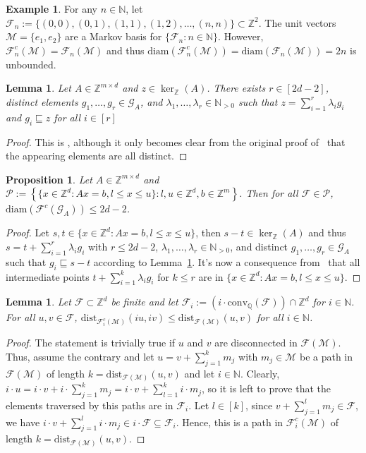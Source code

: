 \documentclass[11pt]{amsart}
\newtheorem{lemma}[thm]{Lemma}
\newtheorem{prop}[thm]{Proposition}
\theoremstyle{definition}
\newtheorem{example}[thm]{Example}
\numberwithin{equation}{section}
\newcommand{\ring}[1]{\ensuremath{\mathbb{#1}}}
\renewcommand{\>}{\rangle}
\newcommand{\<}{\langle}
\newcommand{\0}{\mathbf{0}}
\newcommand{\1}{\mathbf{1}}
\newcommand{\2}{\mathbf{2}}
\newcommand\NN{\ring{N}}
\newcommand\QQ{\ring{Q}}
\newcommand\ZZ{\ring{Z}}
\newcommand\cF{{\mathcal F}}
\newcommand\cM{{\mathcal M}}
\newcommand\cG{{\mathcal G}}
\newcommand\cP{{\mathcal P}}
\newcommand{\graver}[1]{\mathcal{G}_{#1}}
\newcommand{\diam}[1]{\mathrm{diam}(#1)}
\newcommand{\dist}[3]{\mathrm{dist}_{#1}(#2,#3)}
\newcommand{\conv}[1]{\mathrm{conv}_\QQ(#1)}
\begin{document}
\begin{example}\label{ex:StairCase}
For any $n\in\NN$, let
$\cF_n:=\{(0,0),(0,1),(1,1),(1,2),\dots,(n,n)\}\subset\ZZ^2$. The
unit vectors $\cM=\{e_1,e_2\}$ are a Markov basis for
$\{\cF_n:n\in\NN\}$. However,
$\cF_n^c(\cM)=\cF_n(\cM)$ and thus $\diam{\cF^c_n(\cM)}=\diam{\cF_n(\cM)}=2n$
is unbounded.
\end{example}

\begin{lemma}\label{l:SignCompatibility}
Let $A\in\ZZ^{m\times d}$ and $z\in\ker_\ZZ(A)$. There exists
$r\in[2d-2]$, distinct elements $g_1,\dots,g_r\in\cG_A$, and
$\lambda_1,\dots,\lambda_r\in\NN_{>0}$ such that
$z=\sum_{i=1}^r\lambda_ig_i$ and $g_i\sqsubseteq z$ for all $i\in[r]$
\end{lemma}
\begin{proof}
This is \cite[Lemma~3.2.3]{Loera2013}, although it only becomes clear
from the original proof of~\cite[Theorem~2.1]{Sebo1990} that the
appearing elements are all distinct.
\end{proof}

\begin{prop}\label{p:DiamCompressedGraverFiberGraphs}
Let $A\in\ZZ^{m\times d}$ and
$\cP:=\left\{\{x\in\ZZ^d: Ax=b, l\le x\le u\}:
l,u\in\ZZ^d,b\in\ZZ^m\right\}$.
Then for all $\cF\in\cP$, 
$\diam{\cF^c(\graver{A})}\le 2d-2$.
\end{prop}
\begin{proof} Let $s,t\in\{x\in\ZZ^d: Ax=b, l\le x\le u\}$, then
$s-t\in\ker_\ZZ(A)$ and thus $s=t+\sum_{i=1}^r\lambda_ig_i$ with $r\le
2d-2$, $\lambda_1,\dots,\lambda_r\in\NN_{>0}$, and distinct
$g_1,\dots,g_r\in\graver{A}$ such that $g_i\sqsubseteq s-t$ according
to Lemma~\ref{l:SignCompatibility}. It's now a
consequence from~\cite[Lemma~3.2.4]{Loera2013} that all intermediate
points $t+\sum_{i=1}^k\lambda_ig_i$ for $k\le r$ are in $\{x\in\ZZ^d:
Ax=b, l\le x\le u\}$.
\end{proof}

\begin{lemma}\label{l:DistOfScaledMoves}
Let $\cF\subset\ZZ^d$ be finite and let 
$\cF_i:=(i\cdot\conv{\cF})\cap\ZZ^d$ for $i\in\NN$. For all $u,v\in\cF$,
$\dist{\cF^c_i(\cM)}{iu}{iv}\le\dist{\cF(\cM)}{u}{v}$ for all
$i\in\NN$.
\end{lemma}
\begin{proof}
The statement is trivially true if $u$ and $v$ are disconnected in
$\cF(\cM)$. Thus, assume the contrary and let $u=v+\sum_{j=1}^k m_j$
with $m_j\in\cM$ be a path in $\cF(\cM)$ of length
$k=\dist{\cF(\cM)}{u}{v}$ and let $i\in\NN$. Clearly, $i\cdot u=i\cdot
v+i\cdot\sum_{j=1}^km_j=i\cdot v+ \sum_{l=1}^ki\cdot m_j$, so it is
left to prove that the elements traversed by this paths are in $\cF_i$.
Let $l\in[k]$, since $v+\sum_{j=1}^lm_j\in\cF$, we have $i\cdot v+\sum_{j=1}^l
i\cdot m_j\in i\cdot \cF\subseteq\cF_i$. Hence, this is a path in
$\cF^c_i(\cM)$ of length $k=\dist{\cF(\cM)}{u}{v}$.
\end{proof}
\end{document}
